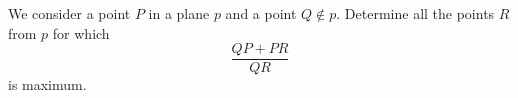 We consider a point $P$ in a plane $p$ and a point $Q \not\in p$. Determine all the points $R$ from $p$ for which \[ \frac{QP+PR}{QR}  \] is maximum.